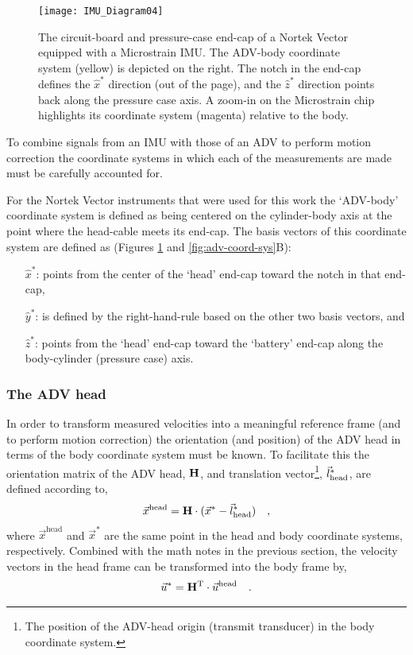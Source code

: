 \begin{figure}
  \centering
  \texttt{[image: IMU\_Diagram04]}
  \caption{The circuit-board and pressure-case end-cap of a Nortek Vector equipped with a Microstrain IMU.  The ADV-body coordinate system (yellow) is depicted on the right. The notch in the end-cap defines the $\hat{x}^*$ direction (out of the page), and the $\hat{z}^*$ direction points back along the pressure case axis. A zoom-in on the Microstrain chip highlights its coordinate system (magenta) relative to the body. }
  \label{fig:imu_orient}
\end{figure}

To combine signals from an IMU with those of an ADV to perform motion correction the coordinate systems in which each of the measurements are made must be carefully accounted for. 

For the Nortek Vector instruments that were used for this work the `ADV-body' coordinate system is defined as being centered on the cylinder-body axis at the point where the head-cable meets its end-cap.  The basis vectors of this coordinate system are defined as (Figures \ref{fig:imu_orient} and \ref{fig:adv-coord-sys}B):
\begin{itemize}
\item[$\hat{x}^*$:] points from the center of the `head' end-cap toward the notch in that end-cap,
\item[$\hat{y}^*$:] is defined by the right-hand-rule based on the other two basis vectors, and
\item[$\hat{z}^*$:] points from the `head' end-cap toward the `battery' end-cap along the body-cylinder (pressure case) axis.
\end{itemize}

\subsubsection{The ADV head}

In order to transform measured velocities into a meaningful reference frame (and to perform motion correction) the orientation (and position) of the ADV head in terms of the body coordinate system must be known. To facilitate this the orientation matrix of the ADV head, $\mathbf{H}$, and translation vector\footnote{The position of the ADV-head origin (transmit transducer) in the body coordinate system.}, $\vec{l}_\mathrm{head}^*$, are defined according to,
\begin{align}
  \label{eqn:coord_sys}
  \vec{x}^\mathrm{head} &= \mathbf{H} \cdot (\vec{x}^* - \vec{l}_\mathrm{head}^*) & ,
\end{align}
where $\vec{x}^\mathrm{head}$ and $\vec{x}^*$ are the same point in the head and body coordinate systems, respectively. Combined with the math notes in the previous section, the velocity vectors in the head frame can be transformed into the body frame by,
\begin{align}
  \label{eqn:coord_sys2}
  \vec{u}^* &=  \mathbf{H}^\mathrm{T} \cdot \vec{u}^\mathrm{head} & .
\end{align}

